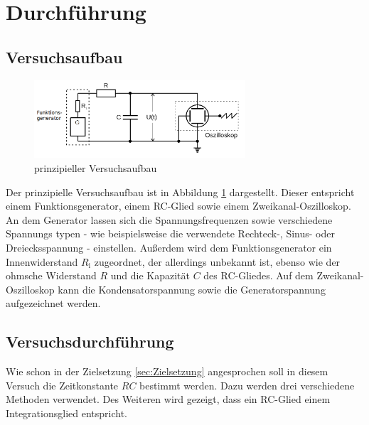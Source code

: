 \section{Durchführung}
\label{sec:Durchführung}

\subsection{Versuchsaufbau}
\label{sec:Versuchsaufbau}

\begin{figure}
	\caption{prinzipieller Versuchsaufbau}
	\label{fig:aufbauamk}
	\centering
	\includegraphics[width=0.7\textwidth]{bilder/generator.png}
\end{figure}

Der prinzipielle Versuchsaufbau ist in Abbildung \ref{fig:aufbauamk} dargestellt.
Dieser entspricht einem Funktionsgenerator, einem RC-Glied sowie einem Zweikanal-Oszilloskop.
An dem Generator lassen sich die Spannungsfrequenzen sowie verschiedene Spannungs
typen - wie beispielsweise die verwendete Rechteck-, Sinus- oder Dreiecksspannung - einstellen.
Außerdem wird dem Funktionsgenerator ein Innenwiderstand $R_{\text{i}}$ zugeordnet, der allerdings unbekannt ist, ebenso wie der ohmsche Widerstand $R$ und die Kapazität $C$ des RC-Gliedes.
Auf dem Zweikanal-Oszilloskop kann die Kondensatorspannung sowie die Generatorspannung aufgezeichnet werden.

\subsection{Versuchsdurchführung}
\label{sec:Versuchsdurchführung}

Wie schon in der Zielsetzung \ref{sec:Zielsetzung} angesprochen soll in diesem Versuch die
Zeitkonstante $RC$ bestimmt werden.
Dazu werden drei verschiedene Methoden verwendet.
Des Weiteren wird gezeigt, dass ein RC-Glied einem Integrationsglied entspricht.

